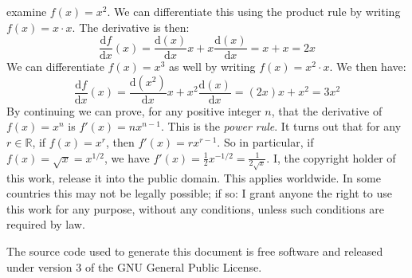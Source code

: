 \documentclass{article}
\theoremstyle{normal}
\theoremstyle{plain}
\begin{document}
    examine $f(x)=x^{2}$. We can differentiate this using the product rule
    by writing $f(x)=x\cdot{x}$. The derivative is then:
    \begin{equation}
        \frac{\textrm{d}f}{\textrm{d}x}(x)=
        \frac{\textrm{d}(x)}{\textrm{d}x}x+x\frac{\textrm{d}(x)}{\textrm{d}x}
        =x+x=2x
    \end{equation}
    We can differentiate $f(x)=x^{3}$ as well by writing
    $f(x)=x^{2}\cdot{x}$. We then have:
    \begin{equation}
        \frac{\textrm{d}f}{\textrm{d}x}(x)=
        \frac{\textrm{d}(x^{2})}{\textrm{d}x}x
            +x^{2}\frac{\textrm{d}(x)}{\textrm{d}x}
        =(2x)x+x^{2}=3x^{2}
    \end{equation}
    By continuing we can prove, for any positive integer $n$, that the
    derivative of $f(x)=x^{n}$ is $f'(x)=nx^{n-1}$. This is the
    \textit{power rule}. It turns out that for any $r\in\mathbb{R}$, if
    $f(x)=x^{r}$, then $f'(x)=rx^{r-1}$. So in particular, if
    $f(x)=\sqrt{x}=x^{1/2}$, we have
    $f'(x)=\frac{1}{2}x^{-1/2}=\frac{1}{2\sqrt{x}}$.
    \newpage
    I, the copyright holder of this work, release it into the public domain.
    This applies worldwide. In some countries this may not be legally possible;
    if so: I grant anyone the right to use this work for any purpose, without
    any conditions, unless such conditions are required by law.
    \par\hfill\par
    The source code used to generate this document is free software and released
    under version 3 of the GNU General Public License.
\end{document}

